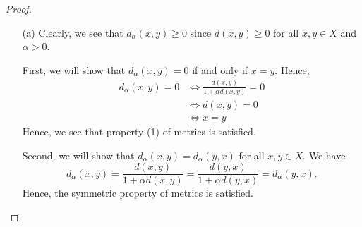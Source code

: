 \documentclass[a4paper]{article}
\begin{document}
\begin{proof}
\begin{enumerate}
    \item[(a)] Clearly, we see that \( {d}_{\alpha}(x,y) \geq 0  \) since \( d(x,y) \geq 0  \) for all \( x,y \in X  \) and \( \alpha > 0  \).   

        First, we will show that \( {d}_{\alpha}(x,y) = 0  \) if and only if \( x = y  \). Hence, 
        \begin{align*}
            {d}_{\alpha}(x,y) = 0 &\iff \frac{ d(x,y)  }{  1  + \alpha d(x,y)  }  = 0  \\
                                  &\iff d(x,y) = 0  \\
                                  &\iff x = y \tag{\( d \) is a metric on \( X  \)}
        \end{align*}
        Hence, we see that property (1) of metrics is satisfied.

        Second, we will show that \( {d}_{\alpha}(x,y) = {d}_{\alpha}(y,x) \) for all \( x,y \in X  \). We have 
        \[  {d}_{\alpha}(x,y) = \frac{ d(x,y)  }{  1 + \alpha d(x,y)  }  = \frac{ d(y,x) }{  1 + \alpha d(y,x) } = {d}_{\alpha}(y,x). \]
        Hence, the symmetric property of metrics is satisfied.
        

\end{enumerate}
\end{proof}
\end{document}
